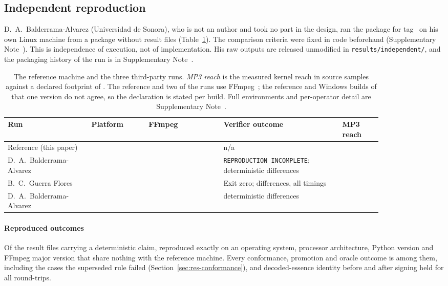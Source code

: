 \documentclass[preprint,3p,11pt,authoryear]{elsarticle}
\begin{document}
\subsection{Independent reproduction}
\label{sec:res-independent}

D.~A.~Balderrama-Alvarez (Universidad de Sonora), who is not an author and took
no part in the design, ran the package for tag~\IRtag{} on his own Linux
machine from a package without result files (Table~\ref{tab:runs}). The
comparison criteria were fixed in code beforehand (Supplementary Note~\NoteRepro{}).
This is independence of execution, not of implementation. His raw outputs are
released unmodified in \texttt{results/independent/}, and the packaging history
of the run is in Supplementary Note~\NoteIndependent{}.

\begin{table}[tbp]
\centering
\caption{The reference machine and the three third-party runs. \emph{MP3
reach} is the measured kernel reach in source samples against a declared
footprint of \IRmpDeclared{}. The reference and two of the runs use
FFmpeg~\Vffmpeg{}; the reference and Windows builds of that one version do
not agree, so the declaration is stated per build. Full
environments and per-operator detail are Supplementary
Note~\NoteIndependent{}.}
\label{tab:runs}
\footnotesize
\begin{tabular}{p{0.19\linewidth}p{0.13\linewidth}p{0.17\linewidth}p{0.27\linewidth}p{0.09\linewidth}}
\toprule
Run & Platform & FFmpeg & Verifier outcome & MP3 reach \\
\midrule
Reference (this paper) & \Vos{} & \Vffmpeg{} & n/a & \XBRefReach{} \\
\addlinespace
D.~A.~Balderrama-Alvarez & \IRos{} & \IRffmpeg{} &
\texttt{REPRODUCTION INCOMPLETE}; \IRdet{} deterministic differences &
\IRmpReach{} \\
\addlinespace
B.~C.~Guerra Flores & \XBMacOs{} & \XBMacFfmpeg{} &
Exit zero; \XBMacEnvDiffs{} differences, all timings & \XBMacReach{} \\
\addlinespace
D.~A.~Balderrama-Alvarez & \XBWinOs{} & \XBWinFfmpeg{} &
\XBWinDetDiffs{} deterministic differences & \XBWinReach{} \\
\bottomrule
\end{tabular}
\end{table}

\paragraph{Reproduced outcomes} Of the \IRfiles{} result files carrying a
deterministic claim, \IRclean{} reproduced exactly on an operating system,
processor architecture, Python version and FFmpeg major version that share
nothing with the reference machine. Every conformance, promotion and oracle
outcome is among them, including the \LscopeFailBad{} cases the superseded rule
failed (Section~\ref{sec:res-conformance}), and decoded-essence identity before and after
signing held for all \Ftotal{} round-trips.
\end{document}
